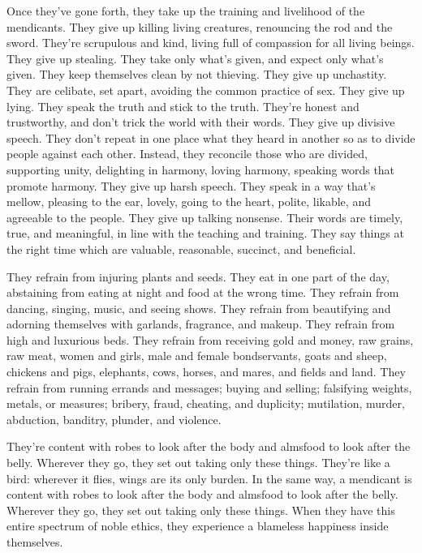 \documentclass[12pt,openany]{book}%
\begin{document}
Once they’ve gone forth, they take up the training and livelihood of the mendicants. They give up killing living creatures, renouncing the rod and the sword. They’re scrupulous and kind, living full of compassion for all living beings. They give up stealing. They take only what’s given, and expect only what’s given. They keep themselves clean by not thieving. They give up unchastity. They are celibate, set apart, avoiding the common practice of sex. They give up lying. They speak the truth and stick to the truth. They’re honest and trustworthy, and don’t trick the world with their words. They give up divisive speech. They don’t repeat in one place what they heard in another so as to divide people against each other. Instead, they reconcile those who are divided, supporting unity, delighting in harmony, loving harmony, speaking words that promote harmony. They give up harsh speech. They speak in a way that’s mellow, pleasing to the ear, lovely, going to the heart, polite, likable, and agreeable to the people. They give up talking nonsense. Their words are timely, true, and meaningful, in line with the teaching and training. They say things at the right time which are valuable, reasonable, succinct, and beneficial. 

They refrain from injuring plants and seeds. They eat in one part of the day, abstaining from eating at night and food at the wrong time. They refrain from dancing, singing, music, and seeing shows. They refrain from beautifying and adorning themselves with garlands, fragrance, and makeup. They refrain from high and luxurious beds. They refrain from receiving gold and money, raw grains, raw meat, women and girls, male and female bondservants, goats and sheep, chickens and pigs, elephants, cows, horses, and mares, and fields and land. They refrain from running errands and messages; buying and selling; falsifying weights, metals, or measures; bribery, fraud, cheating, and duplicity; mutilation, murder, abduction, banditry, plunder, and violence. 

They’re content with robes to look after the body and almsfood to look after the belly. Wherever they go, they set out taking only these things. They’re like a bird: wherever it flies, wings are its only burden. In the same way, a mendicant is content with robes to look after the body and almsfood to look after the belly. Wherever they go, they set out taking only these things. When they have this entire spectrum of noble ethics, they experience a blameless happiness inside themselves. 
\end{document}
